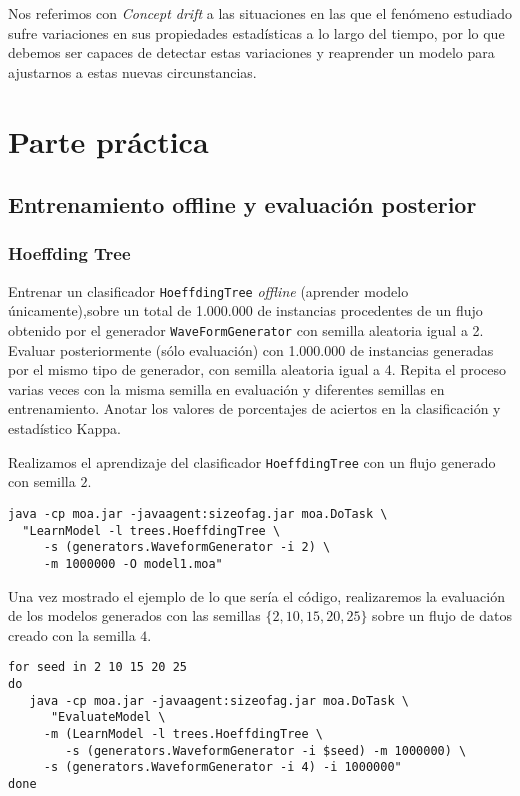\documentclass[11pt]{article}
\begin{document}
Nos referimos con \emph{Concept drift} a las situaciones en las que el
fenómeno estudiado sufre variaciones en sus propiedades estadísticas a
lo largo del tiempo, por lo que debemos ser capaces de detectar estas
variaciones y reaprender un modelo para ajustarnos a estas nuevas
circunstancias. 

\section{Parte práctica}
\label{sec:org6b7d2d7}

\subsection{Entrenamiento offline y evaluación posterior}
\label{sec:org4c77238}
\subsubsection{Hoeffding Tree}
\label{sec:org7abd73d}
Entrenar un clasificador \texttt{HoeffdingTree} \emph{offline} (aprender modelo
únicamente),sobre un total de 1.000.000 de instancias procedentes de
un flujo obtenido por el generador \texttt{WaveFormGenerator} con semilla
aleatoria igual a 2. Evaluar posteriormente (sólo evaluación) con
1.000.000 de instancias generadas por el mismo tipo de generador,
con semilla aleatoria igual a 4. Repita el proceso varias veces con
la misma semilla en evaluación y diferentes semillas en
entrenamiento. Anotar los valores de porcentajes de aciertos en la
clasificación y estadístico Kappa.


Realizamos el aprendizaje del clasificador \texttt{HoeffdingTree} con un flujo
generado con semilla \(2\).

\begin{verbatim}
java -cp moa.jar -javaagent:sizeofag.jar moa.DoTask \
  "LearnModel -l trees.HoeffdingTree \
     -s (generators.WaveformGenerator -i 2) \
     -m 1000000 -O model1.moa"
\end{verbatim}
\captionof{figure}{\label{orge32ec9a}
"Aprendizaje HoeffdingTree"}


Una vez mostrado el ejemplo de lo que sería el código, realizaremos la
evaluación de los modelos generados con las semillas
\(\{2,10,15,20,25\}\) sobre un flujo de datos creado con la semilla \(4\).

\begin{verbatim}
for seed in 2 10 15 20 25
do
   java -cp moa.jar -javaagent:sizeofag.jar moa.DoTask \
      "EvaluateModel \
	 -m (LearnModel -l trees.HoeffdingTree \
	    -s (generators.WaveformGenerator -i $seed) -m 1000000) \
	 -s (generators.WaveformGenerator -i 4) -i 1000000"
done
\end{verbatim}
\end{document}
